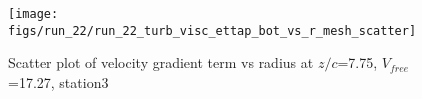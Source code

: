 \begin{figure}[H]
\centering
\texttt{[image: figs/run\_22/run\_22\_turb\_visc\_ettap\_bot\_vs\_r\_mesh\_scatter]}
\caption{Scatter plot of velocity gradient term vs radius at $z/c$=7.75, $V_{free}$=17.27, station3}
\label{fig:run_22_turb_visc_ettap_bot_vs_r_mesh_scatter}
\end{figure}


